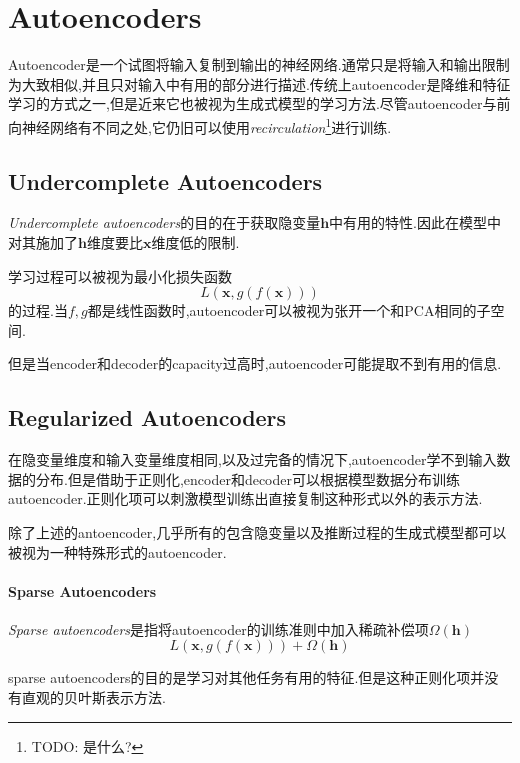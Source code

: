 \chapter{Autoencoders}

Autoencoder是一个试图将输入复制到输出的神经网络.通常只是将输入和输出限制为大致相似,并且只对输入中有用的部分进行描述.传统上autoencoder是降维和特征学习的方式之一,但是近来它也被视为生成式模型的学习方法.尽管autoencoder与前向神经网络有不同之处,它仍旧可以使用\textit{recirculation}\footnote{TODO: 是什么?}进行训练.

\section{Undercomplete Autoencoders}

\textit{Undercomplete autoencoders}的目的在于获取隐变量$\bm h$中有用的特性.因此在模型中对其施加了$\bm h$维度要比$\bm x$维度低的限制.

学习过程可以被视为最小化损失函数
\begin{equation}
L(\bm x,g(f(\bm x)))
\end{equation}
的过程.当$f,g$都是线性函数时,autoencoder可以被视为张开一个和PCA相同的子空间.

但是当encoder和decoder的capacity过高时,autoencoder可能提取不到有用的信息.

\section{Regularized Autoencoders}

在隐变量维度和输入变量维度相同,以及过完备的情况下,autoencoder学不到输入数据的分布.但是借助于正则化,encoder和decoder可以根据模型数据分布训练autoencoder.正则化项可以刺激模型训练出直接复制这种形式以外的表示方法.

除了上述的antoencoder,几乎所有的包含隐变量以及推断过程的生成式模型都可以被视为一种特殊形式的autoencoder.

\subsubsection{Sparse Autoencoders}

\textit{Sparse autoencoders}是指将autoencoder的训练准则中加入稀疏补偿项$\Omega(\bm h)$
\begin{equation}
L(\bm x,g(f(\bm x)))+\Omega(\bm h)
\end{equation}

sparse autoencoders的目的是学习对其他任务有用的特征.但是这种正则化项并没有直观的贝叶斯表示方法.

